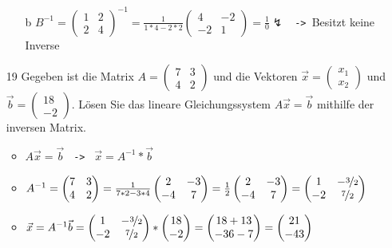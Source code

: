 \documentclass{article}
\begin{document}
\begin{itemize}
\begin{itemize}
			\item[b]{$B^{-1}=\begin{pmatrix} 1 & 2 \\ 2 & 4 \end{pmatrix}^{-1}=\frac{1}{1*4-2*2}\begin{pmatrix} 4 & -2 \\ -2 & 1 \end{pmatrix}=\frac{1}{0} \lightning$ \texttt{ -> }Besitzt keine Inverse}
		\end{itemize}
		\item[19]{Gegeben ist die Matrix $A=\begin{pmatrix} 7 & 3 \\ 4 & 2 \end{pmatrix}$ und die Vektoren $\vec{x}=\begin{pmatrix} x_1 \\ x_2 \end{pmatrix}$ und $\vec{b}=\begin{pmatrix} 18 \\ -2 \end{pmatrix}$. Lösen Sie das lineare Gleichungssystem $A \vec{x}=\vec{b}$ mithilfe der inversen Matrix.}
		\begin{itemize}
			\item{$A \vec{x}=\vec{b}$ \texttt{ -> } $\vec{x}=A^{-1}*\vec{b}$}
			\item{$A^{-1}=\begin{pmatrix} 7 & 3 \\ 4 & 2 \end{pmatrix}=\frac{1}{7*2-3*4}\begin{pmatrix} 2 & -3 \\ -4 & 7 \end{pmatrix}=\frac{1}{2}\begin{pmatrix} 2 & -3 \\ -4 & 7 \end{pmatrix}=\begin{pmatrix} 1 & -\nicefrac{3}{2} \\ -2 & \nicefrac{7}{2} \end{pmatrix}$}
			\item{$\vec{x}=A^{-1} \vec{b}=\begin{pmatrix} 1 & -\nicefrac{3}{2} \\ -2 & \nicefrac{7}{2} \end{pmatrix}*\begin{pmatrix} 18 \\ -2 \end{pmatrix}=\begin{pmatrix} 18+13 \\ -36-7 \end{pmatrix}=\begin{pmatrix} 21 \\ -43 \end{pmatrix}$}

\end{itemize}
\end{itemize}
\end{document}
